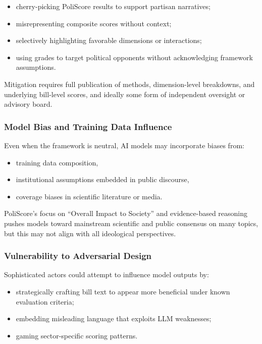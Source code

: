 \documentclass[12pt]{article}
\begin{document}
\begin{itemize}
    \item cherry-picking PoliScore results to support partisan narratives;
    \item misrepresenting composite scores without context;
    \item selectively highlighting favorable dimensions or interactions;
    \item using grades to target political opponents without acknowledging framework assumptions.
\end{itemize}

Mitigation requires full publication of methods, dimension-level breakdowns, and underlying bill-level scores, and ideally
some form of independent oversight or advisory board.

\subsubsection{Model Bias and Training Data Influence}

Even when the framework is neutral, AI models may incorporate biases from:

\begin{itemize}
    \item training data composition,
    \item institutional assumptions embedded in public discourse,
    \item coverage biases in scientific literature or media.
\end{itemize}

PoliScore's focus on ``Overall Impact to Society'' and evidence-based reasoning pushes models toward mainstream scientific
and public consensus on many topics, but this may not align with all ideological perspectives.

\subsubsection{Vulnerability to Adversarial Design}

Sophisticated actors could attempt to influence model outputs by:

\begin{itemize}
    \item strategically crafting bill text to appear more beneficial under known evaluation criteria;
    \item embedding misleading language that exploits LLM weaknesses;
    \item gaming sector-specific scoring patterns.
\end{itemize}
\end{document}
